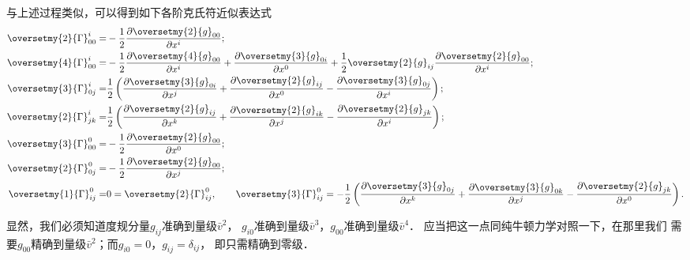 与上述过程类似，可以得到如下各阶克氏符近似表达式
\begin{subequations}\label{chppn:eqn_Gammag}
\begin{align}
    \oversetmy{2}{\Gamma}^i_{00} = & -\frac{1}{2}\frac{\partial \oversetmy{2}{g}_{00}} {\partial x^i} ;\\
    \oversetmy{4}{\Gamma}^i_{00} = & -\frac{1}{2}\frac{\partial \oversetmy{4}{g}_{00}} {\partial x^i}
       + \frac{\partial \oversetmy{3}{g}_{0i}} {\partial x^0}
       + \frac{1}{2}\oversetmy{2}{g}_{ij}\frac{\partial \oversetmy{2}{g}_{00}} {\partial x^i} ;  \\
    \oversetmy{3}{\Gamma}^i_{0j} = & \frac{1}{2}\left(
         \frac{\partial \oversetmy{3}{g}_{0i}} {\partial x^j}
       + \frac{\partial \oversetmy{2}{g}_{ij}} {\partial x^0}
       - \frac{\partial \oversetmy{3}{g}_{0j}} {\partial x^i} \right) ; \\
    \oversetmy{2}{\Gamma}^i_{jk} = & \frac{1}{2}\left(
      \frac{\partial \oversetmy{2}{g}_{ij}} {\partial x^k}
    + \frac{\partial \oversetmy{2}{g}_{ik}} {\partial x^j}
    - \frac{\partial \oversetmy{2}{g}_{jk}} {\partial x^i} \right) ; \\
    \oversetmy{3}{\Gamma}^0_{00} = & -\frac{1}{2}\frac{\partial \oversetmy{2}{g}_{00}} {\partial x^0} ; \\
    \oversetmy{2}{\Gamma}^0_{0j} = & -\frac{1}{2}\frac{\partial \oversetmy{2}{g}_{00}} {\partial x^j} ; \\
    \oversetmy{1}{\Gamma}^0_{ij} = & 0 =\oversetmy{2}{\Gamma}^0_{ij}, \qquad
    \oversetmy{3}{\Gamma}^0_{ij} = -\frac{1}{2} \left(
    \frac{\partial \oversetmy{3}{g}_{0j} }{\partial x^k}
    +\frac{\partial \oversetmy{3}{g}_{0k}}{\partial x^j}
    -\frac{\partial \oversetmy{2}{g}_{jk} }{\partial x^0} \right) .
\end{align}
\end{subequations}

显然，我们必须知道度规分量$g_{ij}$准确到量级$\bar{v}^2$，
$g_{i0}$准确到量级$\bar{v}^3$，$g_{00}$准确到量级$\bar{v}^4$．
应当把这一点同纯牛顿力学对照一下，在那里我们
需要$g_{00}$精确到量级$\bar{v}^2$；而$g_{i0}=0$，$g_{ij}=\delta_{ij}$，
即只需精确到零级．


